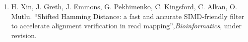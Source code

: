 
\begin{enumerate}
\item  H. Xin, J. Greth, J. Emmons, G. Pekhimenko, C. Kingsford, C. Alkan, O. Mutlu. ``Shifted Hamming Distance: a fast and accurate  SIMD-friendly filter to accelerate alignment verification in read mapping'',{\em Bioinformatics}, under revision.
\end{enumerate}

